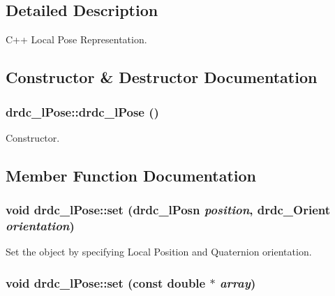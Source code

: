 \subsection{Detailed Description}
C++ Local Pose Representation. 



\subsection{Constructor \& Destructor Documentation}
\hypertarget{classdrdc__lPose_88390e6eb880184af556cb7692706279}{
\subsubsection[drdc\_\-lPose]{\setlength{\rightskip}{0pt plus 5cm}drdc\_\-lPose::drdc\_\-lPose ()}}
\label{classdrdc__lPose_88390e6eb880184af556cb7692706279}


Constructor. 



\subsection{Member Function Documentation}
\hypertarget{classdrdc__lPose_014c2e1bca0662a9f7d1526d5398d82e}{
\subsubsection[set]{\setlength{\rightskip}{0pt plus 5cm}void drdc\_\-lPose::set ({\bf drdc\_\-lPosn} {\em position}, \/  {\bf drdc\_\-Orient} {\em orientation})}}
\label{classdrdc__lPose_014c2e1bca0662a9f7d1526d5398d82e}


Set the object by specifying Local Position and Quaternion orientation. 

\hypertarget{classdrdc__lPose_706422e4993b89982acdbd447f3aed38}{
\subsubsection[set]{\setlength{\rightskip}{0pt plus 5cm}void drdc\_\-lPose::set (const double $\ast$ {\em array})}}
\label{classdrdc__lPose_706422e4993b89982acdbd447f3aed38}


